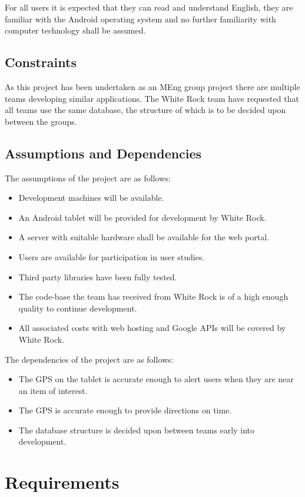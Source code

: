\documentclass[11pt,a4paper]{article}
\begin{document}
For all users it is expected that they can read and understand English, they are familiar with the Android operating system and no further familiarity with computer technology shall be assumed.

\subsection{Constraints}
\label{sec:constraints}
As this project has been undertaken as an MEng group project there are multiple teams developing similar applications. The White Rock team have requested that all teams use the same database, the structure of which is to be decided upon between the groups.

\subsection{Assumptions and Dependencies}
\label{sec:assumptions-dependencies}
The assumptions of the project are as follows:

\begin{itemize}
\item Development machines will be available.
\item An Android tablet will be provided for development by White Rock.
\item A server with suitable hardware shall be available for the web portal.
\item Users are available for participation in user studies.
\item Third party libraries have been fully tested.
\item The code-base the team has received from White Rock is of a high enough quality to continue development.
\item All associated costs with web hosting and Google APIs will be covered by White Rock.
\end{itemize}

The dependencies of the project are as follows:
\begin{itemize}
\item The GPS on the tablet is accurate enough to alert users when they are near an item of interest.
\item The GPS is accurate enough to provide directions on time.
\item The database structure is decided upon between teams early into development.
\end{itemize}

\section{Requirements}
\label{sec:requirements}
\end{document}
